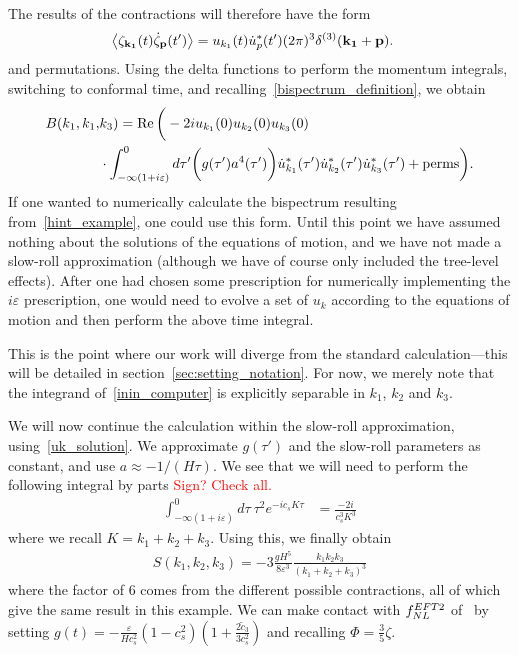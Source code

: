 The results of the contractions will therefore have the form
\begin{align}
    \left<\zeta_{\mathbf{k_1}}(t)\dot{\zeta}_{\mathbf{p}}(t')\right>
    &= u_{k_1}(t)\dot{u}^*_{p}(t')(2\pi)^3\delta^{(3)}(\mathbf{k_1}+\mathbf{p}).
\end{align}
and permutations.
Using the delta functions to perform the momentum integrals,
switching to conformal time,
and recalling~\eqref{bispectrum_definition}, we obtain
\begin{align}\label{inin_computer}
    B(k_1, k_1,&k_3)
    =
    \operatorname{Re}\bigg(-2i u_{k_1}(0)u_{k_2}(0)u_{k_3}(0)\nonumber\\
    &\cdot\int_{-\infty(1+i\varepsilon)}^{0}d\tau'\bigg(g(\tau') a^4(\tau')\bigg)
    \dot{u}^*_{k_1}(\tau')
    \dot{u}^*_{k_2}(\tau')
    \dot{u}^*_{k_3}(\tau')
    +\text{perms}
    \bigg).
\end{align}
If one wanted to numerically calculate the bispectrum resulting from~\eqref{hint_example},
one could use this form. Until this point we have assumed nothing about the solutions of the
equations of motion, and we have not made a slow-roll approximation (although we have
of course only included the tree-level effects).
After one had chosen some prescription for numerically implementing the
$i\varepsilon$ prescription, one would need to evolve a set of $u_{k}$
according to the equations of motion and then perform the above time integral.


This is the point where our work will diverge from the standard calculation---this
will be detailed in section~\ref{sec:setting_notation}. For now, we merely note that
the integrand of~\eqref{inin_computer} is explicitly separable in $k_1$, $k_2$ and $k_3$.


We will now continue the calculation within the slow-roll approximation,
using~\eqref{uk_solution}. We approximate $g(\tau')$ and the slow-roll
parameters as constant, and use $a\approx-1/(H\tau)$.
We see that we will need to perform the following integral by parts
\textcolor{red}{Sign? Check all.}
\begin{align}
    \int_{-\infty(1+i\varepsilon)}^{0}d\tau~\tau^2 e^{-ic_sK\tau}
    &= \frac{-2i}{c_s^3K^3}
\end{align}
where we recall $K=k_1+k_2+k_3$.
Using this, we finally obtain
\begin{align}
    S(k_1, k_2, k_3) = -3\frac{g H^5}{8\varepsilon^3}\frac{k_1k_2k_3}{(k_1+k_2+k_3)^3}
\end{align}
where the factor of $6$ comes from the different possible contractions, all
of which give the same result in this example.
We can make contact with $f_{NL}^{EFT2}$ of~\cite{Planck_NG_2018, Senatore_wmap_2009}
by setting $g(t)=-\frac{\varepsilon}{Hc_s^2}(1-c_s^2)\left(1+\frac{2\tilde{c}_3}{3c_s^2}\right)$
and recalling $\Phi=\frac{3}{5}\zeta$.


